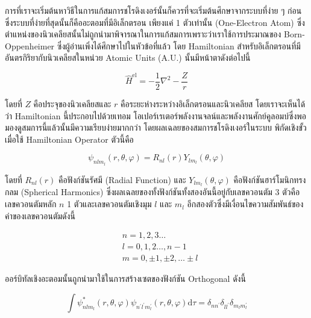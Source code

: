 การที่เราจะเริ่มต้นหาวิธีในการแก้สมการชโรดิงเงอร์นั้นก็ควรที่จะเริ่มต้นศึกษาจากระบบที่ง่าย ๆ ก่อนซึ่งระบบที่ง่ายที่สุดนั้นก็คืออะตอมที่มีอิเล็กตรอน%
เพียงแค่ 1 ตัวเท่านั้น (One-Electron Atom)  ซึ่งตำแหน่งของนิวเคลียสนั้นไม่ถูกนำมาพิจารณาในการแก้สมการเพราะว่าเราใช้การประมาณของ
Born-Oppenheimer ซึ่งผู้อ่านเพิ่งได้ศึกษาไปในหัวข้อที่แล้ว โดย Hamiltonian สำหรับอิเล็กตรอนที่มีอันตรกิริยากับนิวเคลียสในหน่วย Atomic
Units (A.U.) นั้นมีหน้าตาดังต่อไปนี้

\begin{equation}
  \hat{H}^{\text{el}}
  =
  - \frac{1}{2} \nabla^{2}-\frac{Z}{r}
\end{equation}

โดยที่ $Z$ คือประจุของนิวเคลียสและ $r$ คือระยะห่างระหว่างอิเล็กตรอนและนิวเคลียส โดยเราจะเห็นได้ว่า Hamiltonian นี้ประกอบไปด้วยเทอม%
โอเปอร์เรเตอร์พลังงานจลน์และพลังงานศักย์คูลอมบ์ซึ่งพอมองดูสมการนี้แล้วนั้นมีความเรียบง่ายมากกว่า โดยผลเฉลยของสมการชโรดิงเงอร์ในระบบ%
พิกัดเชิงขั้วเมื่อใช้ Hamiltonian Operator ตัวนี้คือ

\begin{equation}
  \psi_{nlm_{l}} (r, \theta, \varphi)
  =
  R_{nl}(r) Y_{lm_{l}} (\theta, \varphi)
\end{equation}

\noindent โดยที่ $R_{nl}(r)$ คือฟังก์ชันรัศมี (Radial Function) และ $Y_{lm_{l}}(\theta, \varphi)$ คือฟังก์ชันฮาร์โมนิกทรงกลม
(Spherical Harmonics) ซึ่งผลเฉลยของทั้งฟังก์ชันทั้งสองอันนี้อยู่กับเลขควอนตัม 3 ตัวคือเลขควอนตัมหลัก $n$ 1 ตัวและเลขควอนตัมเชิงมุม
$l$ และ $m_{l}$ อีกสองตัวซึ่งมีเงื่อนไขความสัมพันธ์ของค่าของเลขควอนตัมดังนี้

\begin{equation*}
  \begin{aligned}
     & n = 1,2,3 \ldots                  \\
     & l = 0,1,2 \ldots, n-1             \\
     & m = 0, \pm 1, \pm 2, \ldots \pm l
  \end{aligned}
\end{equation*}

ออร์บิทัลเชิงอะตอมนั้นถูกนำมาใช้ในการสร้างเซตของฟังก์ชัน Orthogonal ดังนี้

\begin{equation}
  \int \psi_{nlm_{l}}^{*} (r, \theta, \varphi)
  \psi_{n^{\prime} l^{\prime} m^{\prime}_{l}} (r, \theta, \varphi)
  \mathrm{d} \tau
  = \delta_{n n^{\prime}}
  \delta_{l l^{\prime}}
  \delta_{m_{l} m_{l}^{\prime}}
\end{equation}

